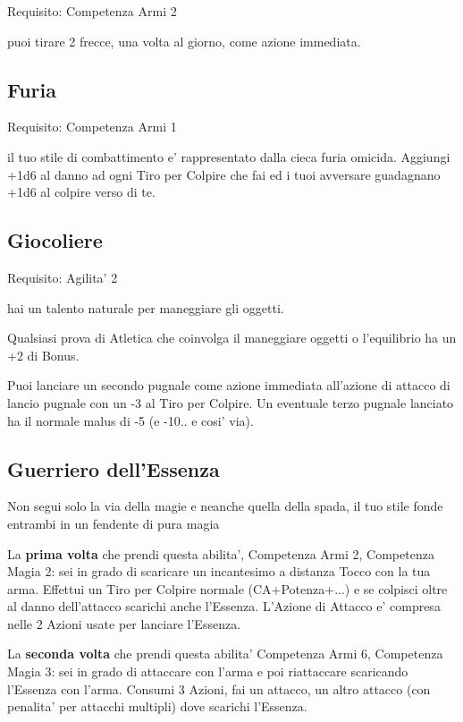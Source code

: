 \documentclass[a4paper,11pt,twoside,openany]{book}
\begin{document}
Requisito: Competenza Armi 2

puoi tirare 2 frecce, una volta al giorno, come azione immediata.

\subsection{Furia}

Requisito: Competenza Armi 1

il tuo stile di combattimento e' rappresentato dalla cieca furia omicida. Aggiungi +1d6 al danno ad ogni Tiro per Colpire che fai ed i tuoi avversare guadagnano +1d6 al colpire verso di te. 

\subsection{Giocoliere}

Requisito: Agilita' 2

hai un talento naturale per maneggiare gli oggetti.

Qualsiasi prova di Atletica che coinvolga il maneggiare oggetti o l'equilibrio ha un +2 di Bonus.

Puoi lanciare un secondo pugnale come azione immediata all'azione di attacco di lancio pugnale con un -3 al Tiro per Colpire. Un eventuale terzo pugnale lanciato ha il normale malus di -5 (e -10.. e cosi' via).

\subsection{Guerriero dell'Essenza}

Non segui solo la via della magie e neanche quella della spada, il tuo stile fonde entrambi in un fendente di pura magia

La \textbf{prima volta} che prendi questa abilita', Competenza Armi 2, Competenza Magia 2: sei in grado di scaricare un incantesimo a distanza Tocco con la tua arma. Effettui un Tiro per Colpire normale (CA+Potenza+...) e se colpisci oltre al danno dell'attacco scarichi anche l'Essenza. L'Azione di Attacco e' compresa nelle 2 Azioni usate per lanciare l'Essenza.

La \textbf{seconda volta} che prendi questa abilita' Competenza Armi 6, Competenza Magia 3: sei in grado di attaccare con l'arma e poi riattaccare scaricando l'Essenza con l'arma. Consumi 3 Azioni, fai un attacco, un altro attacco (con penalita' per attacchi multipli) dove scarichi l'Essenza.
\end{document}
